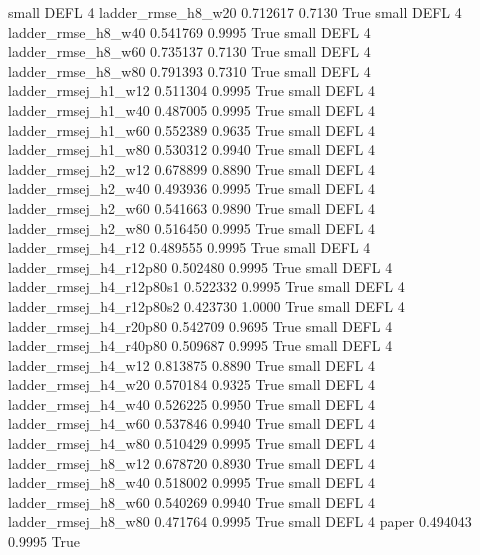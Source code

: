      small     DEFL                 4       ladder_rmse_h8_w20   0.712617      0.7130    True
     small     DEFL                 4       ladder_rmse_h8_w40   0.541769      0.9995    True
     small     DEFL                 4       ladder_rmse_h8_w60   0.735137      0.7130    True
     small     DEFL                 4       ladder_rmse_h8_w80   0.791393      0.7310    True
     small     DEFL                 4      ladder_rmsej_h1_w12   0.511304      0.9995    True
     small     DEFL                 4      ladder_rmsej_h1_w40   0.487005      0.9995    True
     small     DEFL                 4      ladder_rmsej_h1_w60   0.552389      0.9635    True
     small     DEFL                 4      ladder_rmsej_h1_w80   0.530312      0.9940    True
     small     DEFL                 4      ladder_rmsej_h2_w12   0.678899      0.8890    True
     small     DEFL                 4      ladder_rmsej_h2_w40   0.493936      0.9995    True
     small     DEFL                 4      ladder_rmsej_h2_w60   0.541663      0.9890    True
     small     DEFL                 4      ladder_rmsej_h2_w80   0.516450      0.9995    True
     small     DEFL                 4      ladder_rmsej_h4_r12   0.489555      0.9995    True
     small     DEFL                 4   ladder_rmsej_h4_r12p80   0.502480      0.9995    True
     small     DEFL                 4 ladder_rmsej_h4_r12p80s1   0.522332      0.9995    True
     small     DEFL                 4 ladder_rmsej_h4_r12p80s2   0.423730      1.0000    True
     small     DEFL                 4   ladder_rmsej_h4_r20p80   0.542709      0.9695    True
     small     DEFL                 4   ladder_rmsej_h4_r40p80   0.509687      0.9995    True
     small     DEFL                 4      ladder_rmsej_h4_w12   0.813875      0.8890    True
     small     DEFL                 4      ladder_rmsej_h4_w20   0.570184      0.9325    True
     small     DEFL                 4      ladder_rmsej_h4_w40   0.526225      0.9950    True
     small     DEFL                 4      ladder_rmsej_h4_w60   0.537846      0.9940    True
     small     DEFL                 4      ladder_rmsej_h4_w80   0.510429      0.9995    True
     small     DEFL                 4      ladder_rmsej_h8_w12   0.678720      0.8930    True
     small     DEFL                 4      ladder_rmsej_h8_w40   0.518002      0.9995    True
     small     DEFL                 4      ladder_rmsej_h8_w60   0.540269      0.9940    True
     small     DEFL                 4      ladder_rmsej_h8_w80   0.471764      0.9995    True
     small     DEFL                 4                    paper   0.494043      0.9995    True
